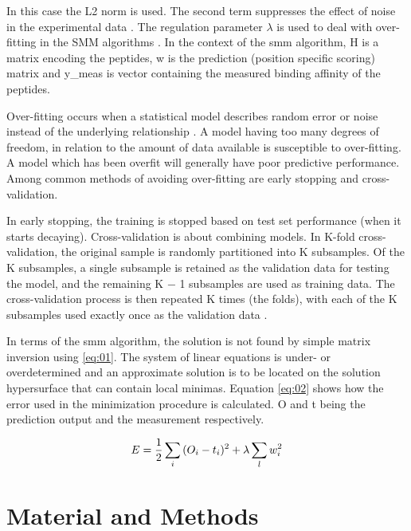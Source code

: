 \documentclass{bioinfo}
\begin{document}
\begin{application}
In this case the L2 norm is used. The second term suppresses the effect of noise in the experimental data \cite{SMM}. The regulation parameter $\lambda$ is used to deal with over-fitting in the SMM algorithms \cite{wiki:overfit}. In the context of the smm algorithm, H is a matrix encoding the peptides, w is the prediction (position specific scoring) matrix and y\_{meas} is vector containing the measured binding affinity of the peptides.
\par Over-fitting occurs when a statistical model describes random error or noise instead of the underlying relationship \cite{Hobohm}. A model having too many degrees of freedom, in relation to the amount of data available is susceptible to over-fitting. A model which has been overfit will generally have poor predictive performance. Among common methods of avoiding over-fitting are early stopping and cross-validation.
\par In early stopping, the training is stopped based on test set performance (when it starts decaying). Cross-validation is about combining models. In K-fold cross-validation, the original sample is randomly partitioned into K subsamples. Of the K subsamples, a single subsample is retained as the validation data for testing the model, and the remaining K − 1 subsamples are used as training data. The cross-validation process is then repeated K times (the folds), with each of the K subsamples used exactly once as the validation data \cite{wiki:crossval}.
\par In terms of the smm algorithm, the solution is not found by simple matrix inversion using \ref{eq:01}. The system of linear equations is under- or overdetermined and an approximate solution is to be located on the solution hypersurface that can contain local minimas. Equation \ref{eq:02} shows how the error used in the minimization procedure is calculated. O and t being the prediction output and the measurement respectively.

\begin{equation}
\label{eq:general}
E = \frac{1}{2} \sum_i{(O_i-t_i)^2} + \lambda \sum_l{w_i^2} \\
\end{equation}


\section*{Material and Methods}


\end{application}
\end{document}
